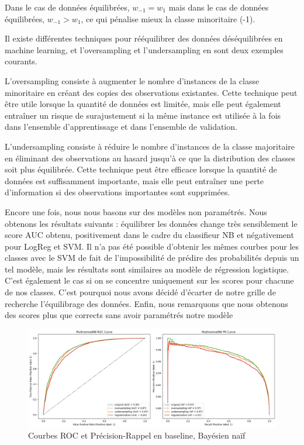 \documentclass{article}
\begin{document}
Dans le cas de données équilibrées, $w_{-1} = w_1$ mais dans le cas de données équilibrées, $w_{-1} > w_{1}$, ce qui pénalise mieux la classe minoritaire (-1).

Il existe différentes techniques pour rééquilibrer des données déséquilibrées en machine learning, et l'oversampling et l'undersampling en sont deux exemples courants.

L'oversampling consiste à augmenter le nombre d'instances de la classe minoritaire en créant des copies des observations existantes. Cette technique peut être utile lorsque la quantité de données est limitée, mais elle peut également entraîner un risque de surajustement si la même instance est utilisée à la fois dans l'ensemble d'apprentissage et dans l'ensemble de validation.

L'undersampling consiste à réduire le nombre d'instances de la classe majoritaire en éliminant des observations au hasard jusqu'à ce que la distribution des classes soit plus équilibrée. Cette technique peut être efficace lorsque la quantité de données est suffisamment importante, mais elle peut entraîner une perte d'information si des observations importantes sont supprimées.

Encore une fois, nous nous basons sur des modèles non paramétrés. Nous obtenons les résultats suivants : équilibrer les données change très sensiblement le score AUC obtenu, positivement dans le cadre du classifieur NB et négativement pour LogReg et SVM. Il n'a pas été possible d'obtenir les mêmes courbes pour les classes avec le SVM de fait de l'impossibilité de prédire des probabilités depuis un tel modèle, mais les résultats sont similaires au modèle de régression logistique. C'est également le cas si on se concentre uniquement sur les scores pour chacune de nos classes. C'est pourquoi nous avons décidé d'écarter de notre grille de recherche l'équilibrage des données. Enfin, nous remarquons que nous obtenons des scores plus que corrects sans avoir paramétrés notre modèle

\begin{figure}[H]
    \centering
    \includegraphics[width=\textwidth]{./src/locuteur/roc_curve_MultinomialNB.png} 
    \caption{Courbes ROC et Précision-Rappel en baseline, Bayésien naïf}
    \label{roc_curve_MultinomialNB}
\end{figure}
\end{document}
